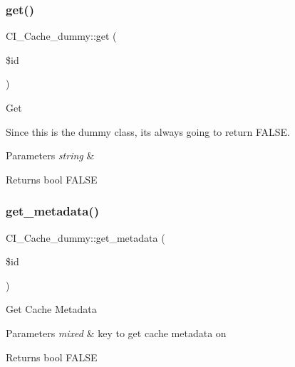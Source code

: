 \subsubsection{\texorpdfstring{get()}{get()}}
{\footnotesize\ttfamily C\+I\+\_\+\+Cache\+\_\+dummy\+::get (\begin{DoxyParamCaption}\item[{}]{\$id }\end{DoxyParamCaption})}

Get

Since this is the dummy class, it\textquotesingle{}s always going to return F\+A\+L\+SE.


\begin{DoxyParams}{Parameters}
{\em string} & \\
\hline
\end{DoxyParams}
\begin{DoxyReturn}{Returns}
bool F\+A\+L\+SE 
\end{DoxyReturn}
\mbox{\label{class_c_i___cache__dummy_affc9022795c57f2e9eba2cf3a9708cab}} 
\subsubsection{\texorpdfstring{get\+\_\+metadata()}{get\_metadata()}}
{\footnotesize\ttfamily C\+I\+\_\+\+Cache\+\_\+dummy\+::get\+\_\+metadata (\begin{DoxyParamCaption}\item[{}]{\$id }\end{DoxyParamCaption})}

Get Cache Metadata


\begin{DoxyParams}{Parameters}
{\em mixed} & key to get cache metadata on \\
\hline
\end{DoxyParams}
\begin{DoxyReturn}{Returns}
bool F\+A\+L\+SE 
\end{DoxyReturn}
\mbox{\label{class_c_i___cache__dummy_a6979b8f31c503e6cc4e7c95fd1b2406c}} 
